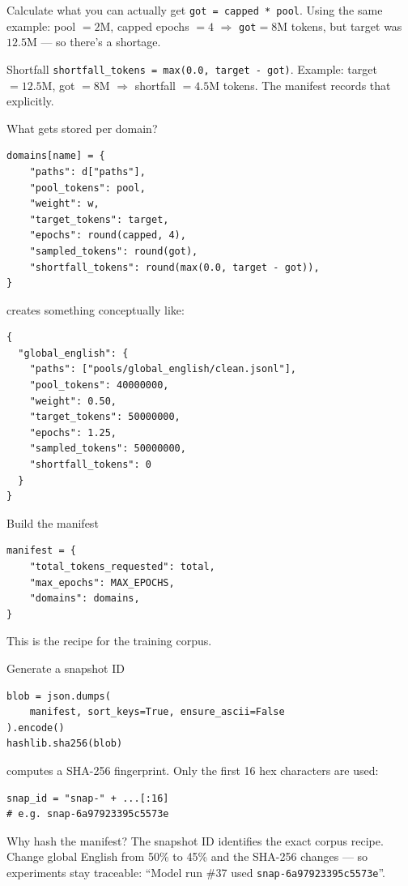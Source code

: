 \begin{paragraphblock}{Calculate what you can actually get}
  \texttt{got = capped * pool}. Using the same example: pool $=2\text{M}$,
  capped epochs $=4$ $\Rightarrow$ \texttt{got}$=8\text{M}$ tokens, but target
  was $12.5\text{M}$ --- so there's a shortage.
\end{paragraphblock}

\begin{paragraphblock}{Shortfall}
  \texttt{shortfall\_tokens = max(0.0, target - got)}. Example: target
  $=12.5\text{M}$, got $=8\text{M}$ $\Rightarrow$ shortfall $=4.5\text{M}$
  tokens. The manifest records that explicitly.
\end{paragraphblock}

\begin{paragraphblock}{What gets stored per domain?}
\begin{lstlisting}[style=shadedpython,breaklines=true]
domains[name] = {
    "paths": d["paths"],
    "pool_tokens": pool,
    "weight": w,
    "target_tokens": target,
    "epochs": round(capped, 4),
    "sampled_tokens": round(got),
    "shortfall_tokens": round(max(0.0, target - got)),
}
\end{lstlisting}
  creates something conceptually like:
\begin{lstlisting}[style=shadedpython,breaklines=true]
{
  "global_english": {
    "paths": ["pools/global_english/clean.jsonl"],
    "pool_tokens": 40000000,
    "weight": 0.50,
    "target_tokens": 50000000,
    "epochs": 1.25,
    "sampled_tokens": 50000000,
    "shortfall_tokens": 0
  }
}
\end{lstlisting}
\end{paragraphblock}

\begin{paragraphblock}{Build the manifest}
\begin{lstlisting}[style=shadedpython,breaklines=true]
manifest = {
    "total_tokens_requested": total,
    "max_epochs": MAX_EPOCHS,
    "domains": domains,
}
\end{lstlisting}
  This is the recipe for the training corpus.
\end{paragraphblock}

\begin{paragraphblock}{Generate a snapshot ID}
\begin{lstlisting}[style=shadedpython,breaklines=true]
blob = json.dumps(
    manifest, sort_keys=True, ensure_ascii=False
).encode()
hashlib.sha256(blob)
\end{lstlisting}
  computes a SHA-256 fingerprint. Only the first 16 hex characters are used:
\begin{lstlisting}[style=shadedpython,language={},basicstyle=\scriptsize\ttfamily]
snap_id = "snap-" + ...[:16]
# e.g. snap-6a97923395c5573e
\end{lstlisting}
  Why hash the manifest? The snapshot ID identifies the exact corpus recipe.
  Change global English from 50\% to 45\% and the SHA-256 changes --- so
  experiments stay traceable: ``Model run \#37 used
  \texttt{snap-6a97923395c5573e}''.
\end{paragraphblock}


